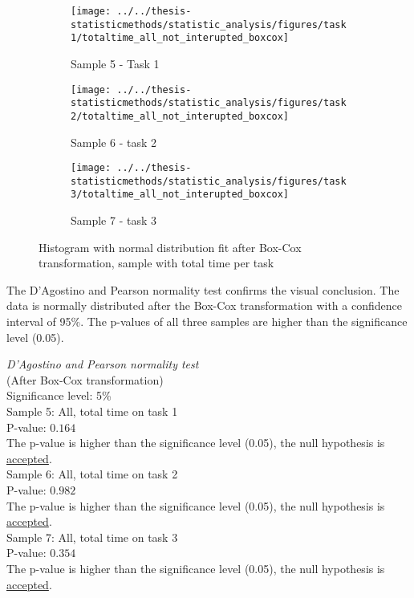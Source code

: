 \begin{figure}[h!]
	\centering
	\begin{subfigure}[b]{0.3\textwidth}
		\centering
		\texttt{[image: ../../thesis-statisticmethods/statistic\_analysis/figures/task1/totaltime\_all\_not\_interupted\_boxcox]}
		\caption{Sample 5 - Task 1}
		\label{fig:totaltimeallnotinteruptedboxcox_task1}
	\end{subfigure}
	\begin{subfigure}[b]{0.3\textwidth}
		\centering
		\texttt{[image: ../../thesis-statisticmethods/statistic\_analysis/figures/task2/totaltime\_all\_not\_interupted\_boxcox]}
		\caption{Sample 6 - task 2}
		\label{fig:totaltimeallnotinteruptedboxcox_task2}
	\end{subfigure}
	\begin{subfigure}[b]{0.3\textwidth}
		\centering
		\texttt{[image: ../../thesis-statisticmethods/statistic\_analysis/figures/task3/totaltime\_all\_not\_interupted\_boxcox]}
		\caption{Sample 7 - task 3}
		\label{fig:totaltimeallnotinteruptedboxcox_task3}
	\end{subfigure}
	\caption{Histogram with normal distribution fit after Box-Cox transformation, sample with total time per task}
\end{figure}

The D'Agostino and Pearson normality test confirms the visual conclusion. The data is normally distributed after the Box-Cox transformation with a confidence interval of 95\%. The p-values of all three samples are higher than the significance level (0.05). \\[0.5cm]

\begin{center}
	\begin{tcolorbox}[box align=center,width=\textwidth-5cm]
		\centering
		\textit{D'Agostino and Pearson normality test}\\
		(After Box-Cox transformation)\\
		Significance level: 5\%  \\[0.5cm]
		
		Sample 5: All, total time on task 1 \\
		P-value: $0.164$\\
		The p-value is higher than the significance level (0.05), the null hypothesis is \underline{accepted}. \\[0.5cm]
		
		Sample 6: All, total time on task 2 \\
		P-value: $0.982$ \\
		The p-value is higher than the significance level (0.05), the null hypothesis is \underline{accepted}. \\[0.5cm]
		
		Sample 7: All, total time on task 3 \\
		P-value: $0.354$ \\
		The p-value is higher than the significance level (0.05), the null hypothesis is \underline{accepted}. \\[0.5cm]
	\end{tcolorbox} 
\end{center}

